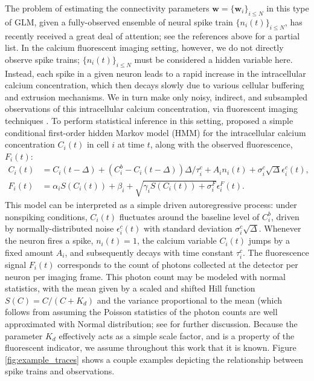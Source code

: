 \documentclass[aoas,preprint]{imsart}
\newcommand{\w}{w}
\newcommand{\bw}{\mathbf{\w}}
\begin{document}
The problem of estimating the connectivity parameters $\bw=\{\bw_i\}_{i\leq N}$ in this type of GLM, given a fully-observed ensemble of neural spike train $\{n_i(t)\}_{i\leq N}$, has recently received a great deal of attention; see the references above for a partial list. In the calcium fluorescent imaging setting, however, we do not directly observe spike trains; $\{n_i(t)\}_{i\leq N}$ must be considered a hidden variable here. Instead, each spike in a given neuron leads to a rapid increase in the intracellular calcium concentration, which then decays slowly due to various cellular buffering and extrusion mechanisms. We in turn make only noisy, indirect, and subsampled observations of this intracellular calcium concentration, via fluorescent imaging techniques \cite{ImagingManual}. To perform statistical inference in this setting, \cite{Vogelstein2009} proposed a simple conditional first-order hidden Markov model (HMM) for the intracellular calcium concentration $C_i(t)$ in cell $i$ at time $t$, along with the observed fluorescence, $F_i(t)$:
\begin{align}
\label{eqn:ca:definition}
C_i(t) &= C_i(t-\Delta) + (C_i^b-C_i(t-\Delta)) \Delta/\tau^c_i + A_i
n_i(t)+\sigma^c_i \sqrt{\Delta} \epsilon^c_i(t), \\ F_i(t) &= \alpha_i
S(C_i(t)) + \beta_i + \sqrt{\gamma_i S(C_i(t)) + \sigma^F_i}
\epsilon^F_i(t). \label{eqn:F:definition}
\end{align}
This model can be interpreted as a simple driven autoregressive process: under nonspiking conditions, $C_i(t)$ fluctuates around the baseline level of $C_i^b$, driven by normally-distributed noise $\epsilon^c_i(t)$ with standard deviation $\sigma^c_i \sqrt{\Delta}$. Whenever the neuron fires a spike, $n_i(t)=1$, the calcium variable $C_i(t)$ jumps by a fixed amount $A_i$, and subsequently decays with time constant $\tau^c_i$. The fluorescence signal $F_i(t)$ corresponds to the count of photons collected at the detector per neuron per imaging frame. This photon count may be modeled with normal statistics, with the mean given by a scaled and shifted Hill function $S(C)=C/(C+K_d)$ \cite{Yasuda2004} and the variance proportional to the mean (which follows from assuming the Poisson statistics of the photon counts are well approximated with Normal distribution; see \cite{Vogelstein2009} for further discussion. Because the parameter $K_d$ effectively acts as a simple scale factor, and is a property of the fluorescent indicator, we assume throughout this work that it is known. Figure \ref{fig:example_traces} shows a couple examples depicting the relationship between spike trains and observations.
\end{document}
